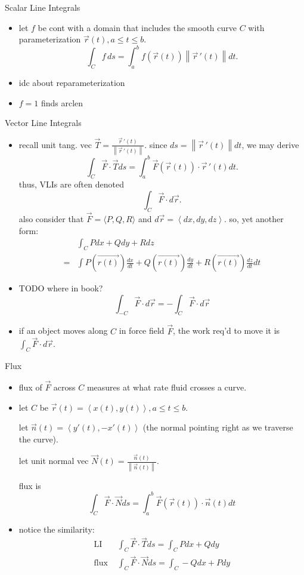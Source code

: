 \documentclass[11pt]{article}
\theoremstyle{definition}
\newcommand{\col}[1]{\begin{minipage}{\columnwidth}#1\end{minipage}}
\newcommand{\magn}[1]{\left\lVert #1 \right\rVert}
\begin{document}
\begin{multicols}{2}
{    Scalar Line Integrals
    \begin{itemize}
      \item let $f$ be cont with a domain that includes the smooth curve $C$ with parameterization $\vec{r}(t), a\le t\le b$.
      \[ \int_C f\, ds = \int_a^b f(\vec{r}(t))\magn{\vec{r}\,'(t)} dt. \]
      \item idc about reparameterization
      \item $f=1$ finds arclen
    \end{itemize}
  }
  \col{
    Vector Line Integrals
    \begin{itemize}
      \item recall unit tang. vec $\vec{T}=\frac{\vec{r}\,'(t)}{\magn{\vec{r}\,'(t)}}$. since $ds=\magn{\vec{r}\,'(t)}dt$, we may derive
      \[ \int_C \vec{F}\cdot\vec{T}ds = \int_a^b \vec{F}(\vec{r}(t))\cdot\vec{r}\,'(t)dt. \]
      thus, VLIs are often denoted
      \[\int_C \vec{F}\cdot d\vec{r}.\]
      also consider that $\vec{F}=\langle P,Q,R \rangle$ and $d\vec{r}=\left<dx,dy,dz\right>$. so, yet another form:
      \begin{align*}
        &\int_C Pdx + Qdy + Rdz\\
        =&\int P(\vec{r(t)}) \frac{dx}{dt} + Q(\vec{r(t)}) \frac{dy}{dt} + R(\vec{r(t)}) \frac{dz}{dt} dt
      \end{align*}
      \item TODO where in book?
      \[\int_{-C}\vec{F}\cdot d\vec{r} = -\int_C \vec{F}\cdot d\vec{r}\]
      \item if an object moves along $C$ in force field $\vec{F}$, the work req'd to move it is $\int_C \vec{F}\cdot d\vec{r}$.
    \end{itemize}
    Flux
    \begin{itemize}
      \item flux of $\vec{F}$ across $C$ measures at what rate fluid crosses a curve.
      \item let $C$ be $\vec{r}(t)=\left<x(t),y(t)\right>, a\le t\le b$.
      
      let $\vec{n}(t) = \left<y'(t),-x'(t)\right>$ (the normal pointing right as we traverse the curve).

      let unit normal vec $\vec{N}(t) = \frac{\vec{n}(t)}{\magn{\vec{n}(t)}}$.

      flux is
      \[\int_C \vec{F}\cdot\vec{N}ds = \int_a^b \vec{F}(\vec{r}(t))\cdot \vec{n}(t)dt\]
      \item notice the similarity:
      \begin{align*}
        \text{LI } & \int_C\vec{F}\cdot\vec{T} ds = \int_C Pdx + Qdy\\
        \text{flux } & \int_C\vec{F}\cdot\vec{N} ds = \int_C -Qdx + Pdy\\
      \end{align*}
    \end{itemize}
  }
\end{multicols}
\end{document}
